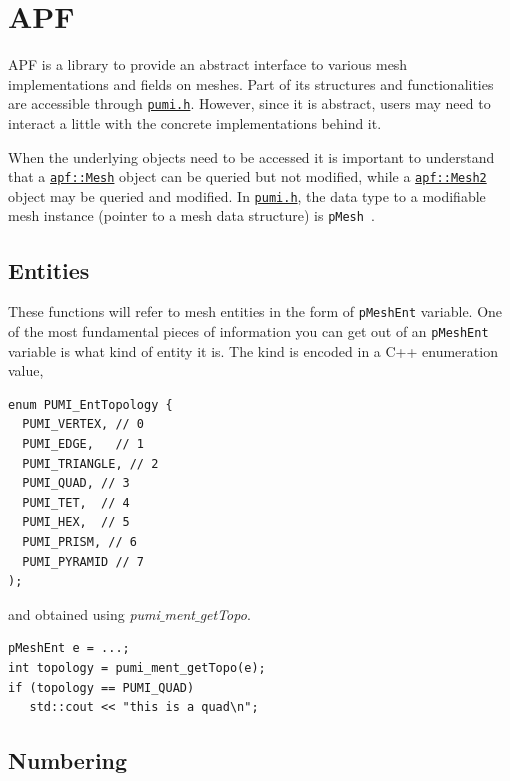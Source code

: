 \documentclass{article}
\begin{document}
\section{APF}

APF is a library to provide an abstract interface to various mesh
implementations and fields on meshes.
Part of its structures and functionalities are accessible through
\href{https://github.com/SCOREC/core/blob/master/pumi/pumi.h}{\texttt{pumi.h}}.
However, since it is abstract, users may need to interact a little with the
concrete implementations behind it.

When the underlying objects need to be accessed it is important to understand
that a
\href{http://scorec.rpi.edu/~dibanez/core/classapf_1_1Mesh.html}{\texttt{apf::Mesh}}
object can be queried but not modified, while a
\href{http://scorec.rpi.edu/~dibanez/core/classapf_1_1Mesh2.html}{\texttt{apf::Mesh2}}
object may be queried and modified.
In \href{https://github.com/SCOREC/core/blob/master/pumi/pumi.h}{\texttt{pumi.h}},
the data type to a modifiable mesh instance (pointer to a mesh data structure)
is \texttt{pMesh}~.

\subsection{Entities}

These functions will refer to mesh entities in the
form of \texttt{pMeshEnt} variable.
One of the most fundamental pieces of information you can get
out of an \texttt{pMeshEnt} variable is what kind of
entity it is.
The kind is encoded in a C++ enumeration value,
\begin{lstlisting}
enum PUMI_EntTopology {
  PUMI_VERTEX, // 0
  PUMI_EDGE,   // 1
  PUMI_TRIANGLE, // 2
  PUMI_QUAD, // 3
  PUMI_TET,  // 4
  PUMI_HEX,  // 5
  PUMI_PRISM, // 6
  PUMI_PYRAMID // 7
);
\end{lstlisting}

and obtained using \emph{pumi$\_$ment$\_$getTopo}.

\begin{lstlisting}
pMeshEnt e = ...;
int topology = pumi_ment_getTopo(e);
if (topology == PUMI_QUAD)
   std::cout << "this is a quad\n";
\end{lstlisting}

\subsection{Numbering}
\label{sec:num}
\end{document}

